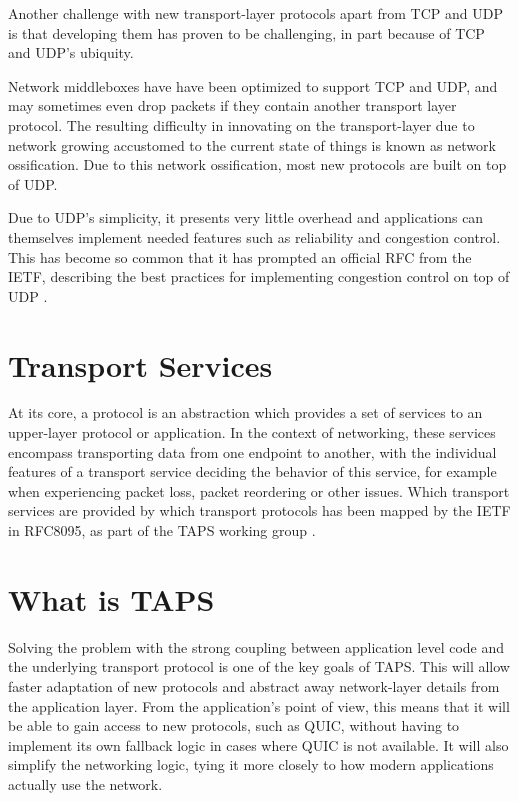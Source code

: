 Another challenge with new transport-layer protocols apart
from TCP and UDP is that developing them has proven to be challenging, 
in part because of TCP and UDP's ubiquity. 

Network middleboxes have have been
optimized to support TCP and UDP, and may sometimes
even drop packets if they contain another transport layer protocol.
The resulting difficulty in innovating on the transport-layer
due to network growing accustomed to the current state of things
is known as network ossification. Due to this network ossification,
most new protocols are built on top of UDP.

Due to UDP's simplicity, it presents very little overhead
and applications can themselves implement needed features
such as reliability and congestion control.
This has become so common that
it has prompted an official RFC from the IETF, describing
the best practices for implementing congestion control on top of UDP 
\cite{eggertUnicastUDPUsage2008}.

\section{Transport Services}
At its core, a protocol is an abstraction which provides a set of
services to an upper-layer protocol or application. In the context of
networking, these services encompass transporting data from one endpoint
to another, with the individual features of a transport service deciding the behavior of
this service, for example when experiencing packet loss, packet reordering
or other issues. Which transport services are provided by which transport
protocols has been mapped by the IETF in RFC8095, as part of the
TAPS working group \cite{fairhurstServicesProvidedIETF2017}.

\section{What is TAPS}
Solving the problem with the strong coupling between application
level code and the underlying transport protocol
is one of the key goals of TAPS. This will allow faster adaptation
of new protocols and abstract away network-layer details from the
application layer. From the application's point of view, this
means that it will be able to gain access to new protocols, such
as QUIC, without having to implement its own fallback logic
in cases where QUIC is not available. It will also simplify
the networking logic, tying it more closely to how modern
applications actually use the network.

